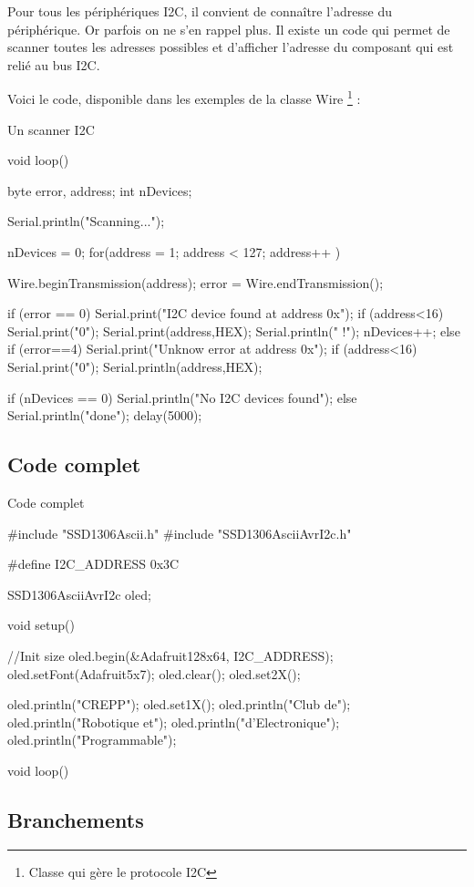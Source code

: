 Pour tous les périphériques I2C, il convient de connaître l'adresse du périphérique. Or parfois on ne s'en rappel plus.
Il existe un code qui permet de scanner toutes les adresses possibles et d'afficher l'adresse du composant qui est relié au bus I2C.

Voici le code, disponible dans les exemples de la classe Wire \footnote{Classe qui gère le protocole I2C} : 

\begin{Cpp}{Un scanner I2C}

void loop()
{
  byte error, address;
  int nDevices;
     
  Serial.println("Scanning...");
     
  nDevices = 0;
  for(address = 1; address < 127; address++ )
  {
    Wire.beginTransmission(address);
    error = Wire.endTransmission();
     
    if (error == 0)
    {
      Serial.print("I2C device found at address 0x");
      if (address<16) {
        Serial.print("0");
      }
      Serial.print(address,HEX);
      Serial.println("  !");
      nDevices++;
    }
    else if (error==4)
    {
      Serial.print("Unknow error at address 0x");
      if (address<16) {
        Serial.print("0");
      } 
      Serial.println(address,HEX);
    }    
  }
  if (nDevices == 0) {
    Serial.println("No I2C devices found\n");
  }
  else {
    Serial.println("done\n");
  }
  delay(5000);         
    
}
\end{Cpp}


\subsection{Code complet}

\begin{Cpp}{Code complet}

  #include "SSD1306Ascii.h"
  #include "SSD1306AsciiAvrI2c.h"
   
  #define I2C_ADDRESS 0x3C
   
  SSD1306AsciiAvrI2c oled;
   
  void setup() {
  
    //Init size
    oled.begin(&Adafruit128x64, I2C_ADDRESS);
    oled.setFont(Adafruit5x7);  
    oled.clear();
    oled.set2X();
  
    
    oled.println("CREPP");
    oled.set1X();
    oled.println("Club de");
    oled.println("Robotique et");
    oled.println("d'Electronique");
    oled.println("Programmable");
   
  }
  void loop() {
   
  }
\end{Cpp}

\subsection{Branchements}





